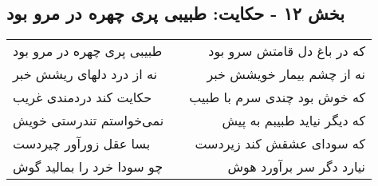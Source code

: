 \begin{center}
\section*{بخش ۱۲ - حکایت: طبیبی پری چهره در مرو بود}
\label{sec:012}
\begin{longtable}{l p{0.5cm} r}
طبیبی پری چهره در مرو بود
&&
که در باغ دل قامتش سرو بود
\\
نه از درد دلهای ریشش خبر
&&
نه از چشم بیمار خویشش خبر
\\
حکایت کند دردمندی غریب
&&
که خوش بود چندی سرم با طبیب
\\
نمی‌خواستم تندرستی خویش
&&
که دیگر نیاید طبیبم به پیش
\\
بسا عقل زورآور چیردست
&&
که سودای عشقش کند زیردست
\\
چو سودا خرد را بمالید گوش
&&
نیارد دگر سر برآورد هوش
\\
\end{longtable}
\end{center}
